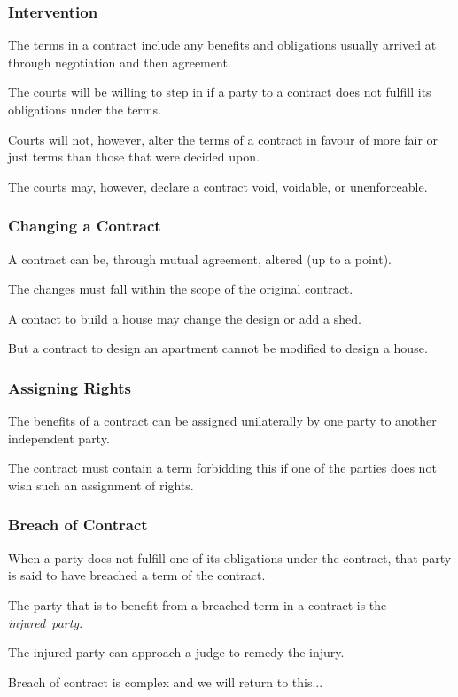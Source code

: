 \begin{frame}
\frametitle{Intervention}

The terms in a contract include any benefits and obligations usually arrived at through negotiation and then agreement.

The courts will be willing to step in if a party to a contract does not fulfill its obligations under the terms.

Courts will not, however, alter the terms of a contract in favour of more fair or just terms than those that were decided upon.

The courts may, however, declare a contract void, voidable, or unenforceable.


\end{frame}



\begin{frame}
\frametitle{Changing a Contract}

A contract can be, through mutual agreement, altered (up to a point).

The changes must fall within the scope of the original contract.

A contact to build a house may change the design or add a shed.

But a contract to design an apartment cannot be modified to design a house.

\end{frame}



\begin{frame}
\frametitle{Assigning Rights}

The benefits of a contract can be assigned unilaterally by one party to another independent party.

The contract must contain a term forbidding this if one of the parties does not wish such an assignment of rights.

\end{frame}



\begin{frame}
\frametitle{Breach of Contract}

When a party does not fulfill one of its obligations under the contract, that party is said to have breached a term of the contract.

The party that is to benefit from a breached term in a contract is the \textit{injured~party}.

The injured party can approach a judge to remedy the injury.

Breach of contract is complex and we will return to this...

\end{frame}

